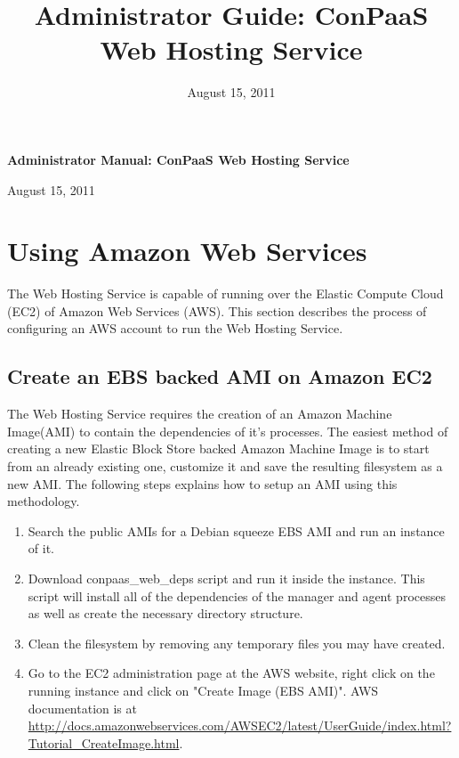\documentclass[12pt]{article}
\begin{document}
\title{Administrator Guide: ConPaaS Web Hosting Service}
\date{August 15, 2011}
\thispagestyle{empty}

\begin{center}
\begingroup
\fontsize{20pt}{20pt}\selectfont
\textbf{Administrator Manual: ConPaaS \linebreak \linebreak Web Hosting Service} \linebreak
\endgroup

\begingroup
\fontsize{16pt}{16pt}\selectfont
August 15, 2011
\endgroup
\end{center}

\section{Using Amazon Web Services}

The Web Hosting Service is capable of running over the Elastic Compute
Cloud (EC2) of Amazon Web Services (AWS). This section describes the
process of configuring an AWS account to run the Web Hosting Service.

\subsection{Create an EBS backed AMI on Amazon EC2}

The Web Hosting Service requires the creation of an Amazon Machine
Image(AMI) to contain the dependencies of it's processes.  The easiest
method of creating a new Elastic Block Store backed Amazon Machine
Image is to start from an already existing one, customize it and save
the resulting filesystem as a new AMI. The following steps explains
how to setup an AMI using this methodology.

\begin{enumerate}
\item Search the public AMIs for a Debian squeeze EBS AMI and run an
  instance of it.
\item Download conpaas\_web\_deps script and run it inside the
  instance.  This script will install all of the dependencies of the
  manager and agent processes as well as create the necessary
  directory structure.
\item Clean the filesystem by removing any temporary files you may
  have created.
\item Go to the EC2 administration page at the AWS website, right
  click on the running instance and click on "Create Image (EBS AMI)".
  AWS documentation is at 
  \href{http://docs.amazonwebservices.com/AWSEC2/latest/UserGuide/index.html?Tutorial_CreateImage.html}{http://docs.amazonwebservices.com/AWSEC2/latest/UserGuide/index.html?Tutorial\_CreateImage.html}.
\end{enumerate}
\end{document}
